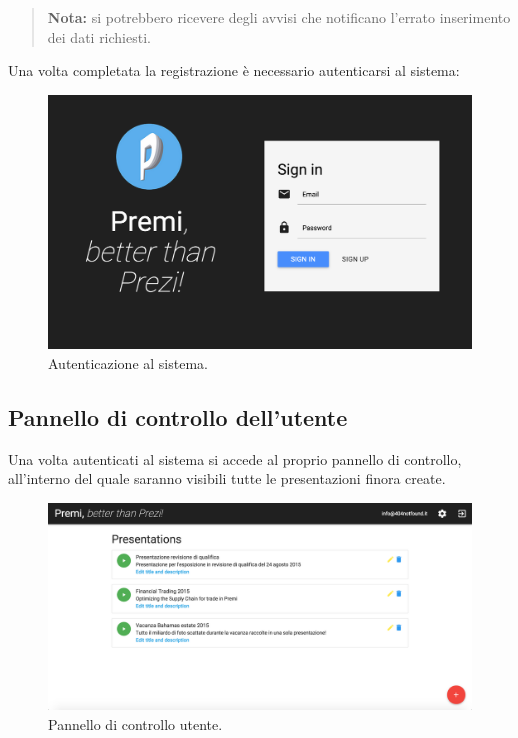 \begin{quote}
\textbf{Nota:} si potrebbero ricevere degli avvisi che notificano l'errato inserimento dei dati richiesti.
\end{quote}

\newpage
Una volta completata la registrazione è necessario autenticarsi al sistema:
\begin{figure}[!h]
\begin{center}
\includegraphics[scale=0.4]{img/signin.png}
\caption{Autenticazione al sistema.}
\end{center}
\end{figure}

\newpage
\subsection{Pannello di controllo dell'utente}
Una volta autenticati al sistema si accede al proprio pannello di controllo, all'interno del quale saranno visibili tutte le presentazioni finora create.
\begin{figure}[H]
\begin{center}
\includegraphics[scale=0.35]{img/dashboard.png}
\caption{Pannello di controllo utente.}
\end{center}
\end{figure}

